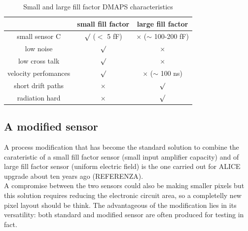       \begin{table}
         \begin{center}
         \begin{tabular}{|c | c |c |}
         \hline
         & small fill factor & large fill factor\\
         \hline
         \hline
         small sensor C & $\surd$ ($<$ 5 fF) & $\times$ ($\sim$ 100-200 fF)\\
         low noise & $\surd$ & $\times$\\
         low cross talk & $\surd$ & $\times$ \\
         velocity perfomances & $\surd$ & $\times$ ($\sim$ 100 ns)\\
         short drift paths & $\times$ & $\surd$ \\
         radiation hard & $\times$ & $\surd$ \\
         \hline
         \end{tabular}
         \caption{Small and large fill factor DMAPS characteristics}
         \label{tab:DMAPS_large_small_fillfactor}
         \end{center}
      \end{table}

   \subsection{A modified sensor}
      A process modification that has become the standard solution to combine the carateristic of a small fill factor sensor (small input amplifier capacity) and of large fill factor sensor (uniform electric field) is the one carried out for ALICE upgrade about ten years ago (REFERENZA).\\
      A compromise between the two sensors could also be making smaller pixels but this solution requires reducing the electronic circuit area, so a completelly new pixel layout should be think. The advantageous of the modification lies in its versatility: both standard and modified sensor are often produced for testing in fact.\\

